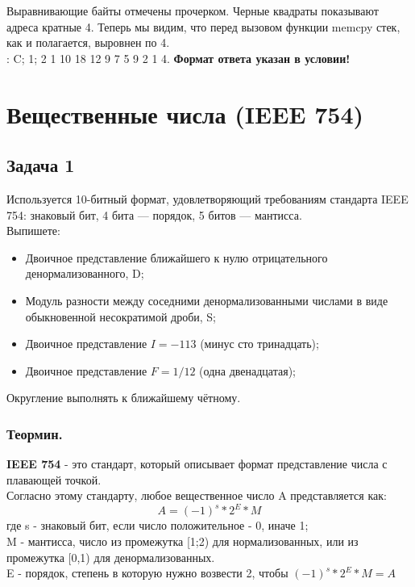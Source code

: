 \documentclass[12pt, letterpaper]{article}
\begin{document}
Выравнивающие байты отмечены прочерком. Черные квадраты показывают адреса кратные 4. Теперь мы видим, что перед вызовом функции memcpy стек, как и полагается, выровнен по 4.\\ 
: C; 1; 2 1 10 18 12 9 7 5 9 2 1 4. \textbf{Формат ответа указан в условии!}
\newpage
\section{Вещественные числа (IEEE 754)}
\subsection{Задача 1}
Используется 10-битный формат, удовлетворяющий требованиям стандарта IEEE 754: знаковый бит, 4 бита — порядок, 5 битов — мантисса.\\

Выпишете:
\begin{itemize}
    \item Двоичное представление ближайшего к нулю отрицательного денормализованного, D;
    \item Модуль разности между соседними денормализованными числами в виде обыкновенной несократимой дроби, S;
    \item Двоичное представление $I=-113$ (минус сто тринадцать);
    \item Двоичное представление $F=1/12$ (одна двенадцатая);
\end{itemize}

Округление выполнять к ближайшему чётному.
\vspace{2cm}
\subsubsection{Теормин.}
\textbf{IEEE 754} - это стандарт, который описывает формат представление числа с плавающей точкой.\\
Согласно этому стандарту, любое вещественное число A представляется как:\\
\[A=(-1)^s*2^E*M\]
где s - знаковый бит, если число положительное - 0, иначе 1;\\
M - мантисса, число из промежутка [1;2) для нормализованных, или из промежутка [0,1) для денормализованных.\\
E - порядок, степень в которую нужно возвести 2, чтобы $(-1)^s*2^E*M=A$
\end{document}
